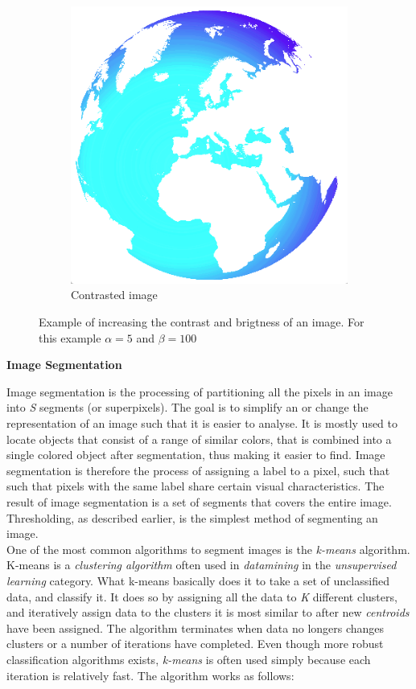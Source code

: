 \begin{figure}
\begin{subfigure}[b]{0.3\textwidth}
                \includegraphics[scale = 0.2]{img/globeContrast}
                \caption{Contrasted image}
        \end{subfigure}
		\caption{Example of increasing the contrast and brigtness of an image. For this example $\alpha = 5$ and $\beta = 100$}
		\label{fig:bright_contrast}
\end{figure}

\noindent \textbf{Image Segmentation} \par
Image segmentation is the processing of partitioning all the pixels in an image into \textit{S} segments (or superpixels). The goal is to simplify an or change the representation of an image such that it is easier to analyse. It is mostly used to locate objects that consist of a range of similar colors, that is combined into a single colored object after segmentation, thus making it easier to find. Image segmentation is therefore the process of assigning a label to a pixel, such that such that pixels with the same label share certain visual characteristics. The result of image segmentation is a set of segments that covers the entire image. Thresholding, as described earlier, is the simplest method of segmenting an image. \\

One of the most common algorithms to segment images is the \textit{k-means} algorithm. K-means is a \textit{clustering algorithm} often used in \textit{datamining} in the \textit{unsupervised learning} category. What k-means basically does it to take a set of unclassified data, and classify it. It does so by assigning all the data to \textit{K} different clusters, and iteratively assign data to the clusters it is most similar to after new \textit{centroids} have been assigned. The algorithm terminates when data no longers changes clusters or a number of iterations have completed. Even though more robust classification algorithms exists, \textit{k-means} is often used simply because each iteration is relatively fast. The algorithm works as follows:

